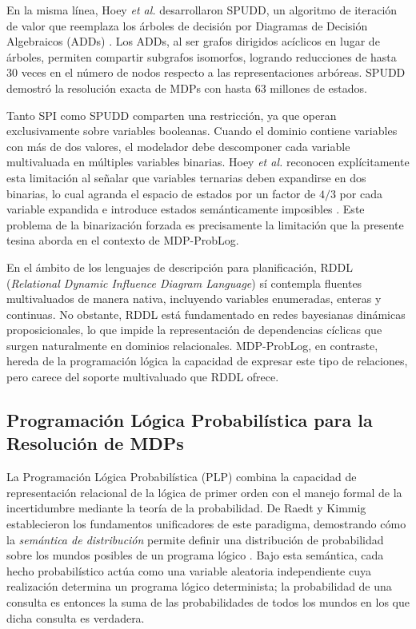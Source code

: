 En la misma línea, Hoey \textit{et al.} desarrollaron SPUDD, un algoritmo de iteración de valor que reemplaza los árboles de decisión por Diagramas de Decisión Algebraicos (ADDs) \cite{hoey1999spudd}. Los ADDs, al ser grafos dirigidos acíclicos en lugar de árboles, permiten compartir subgrafos isomorfos, logrando reducciones de hasta 30 veces en el número de nodos respecto a las representaciones arbóreas. SPUDD demostró la resolución exacta de MDPs con hasta 63 millones de estados.

Tanto SPI como SPUDD comparten una restricción, ya que operan exclusivamente sobre variables booleanas. Cuando el dominio contiene variables con más de dos valores, el modelador debe descomponer cada variable multivaluada en múltiples variables binarias. Hoey \textit{et al.} reconocen explícitamente esta limitación al señalar que variables ternarias deben expandirse en dos binarias, lo cual agranda el espacio de estados por un factor de $4/3$ por cada variable expandida e introduce estados semánticamente imposibles \cite{hoey1999spudd}. Este problema de la binarización forzada es precisamente la limitación que la presente tesina aborda en el contexto de MDP-ProbLog.

En el ámbito de los lenguajes de descripción para planificación, RDDL (\textit{Relational Dynamic Influence Diagram Language}) \cite{sanner2010rddl} sí contempla fluentes multivaluados de manera nativa, incluyendo variables enumeradas, enteras y continuas. No obstante, RDDL está fundamentado en redes bayesianas dinámicas proposicionales, lo que impide la representación de dependencias cíclicas que surgen naturalmente en dominios relacionales. MDP-ProbLog, en contraste, hereda de la programación lógica la capacidad de expresar este tipo de relaciones, pero carece del soporte multivaluado que RDDL ofrece.

\subsection{Programación Lógica Probabilística para la Resolución de MDPs}
\label{sec:ea-plp-mdps}

La Programación Lógica Probabilística (PLP) combina la capacidad de representación relacional de la lógica de primer orden con el manejo formal de la incertidumbre mediante la teoría de la probabilidad. De Raedt y Kimmig establecieron los fundamentos unificadores de este paradigma, demostrando cómo la \textit{semántica de distribución} permite definir una distribución de probabilidad sobre los mundos posibles de un programa lógico \cite{deraedt2015probabilistic}. Bajo esta semántica, cada hecho probabilístico actúa como una variable aleatoria independiente cuya realización determina un programa lógico determinista; la probabilidad de una consulta es entonces la suma de las probabilidades de todos los mundos en los que dicha consulta es verdadera.

